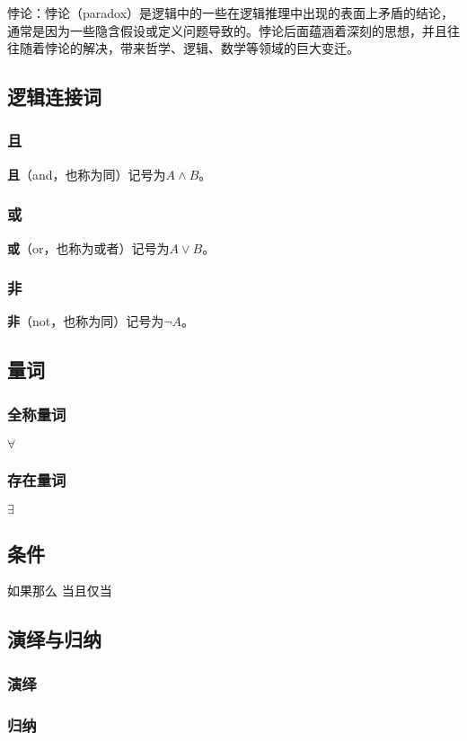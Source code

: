 悖论：悖论（paradox）是逻辑中的一些在逻辑推理中出现的表面上矛盾的结论，通常是因为一些隐含假设或定义问题导致的。悖论后面蕴涵着深刻的思想，并且往往随着悖论的解决，带来哲学、逻辑、数学等领域的巨大变迁。

\subsection{逻辑连接词}

\subsubsection{且}

\textbf{且}（and，也称为同）记号为$A\land B$。

\subsubsection{或}

\textbf{或}（or，也称为或者）记号为$A\lor B$。


\subsubsection{非}
\textbf{非}（not，也称为同）记号为$\lnot A$。

\subsection{量词}

\subsubsection{全称量词}

$\forall$

\subsubsection{存在量词}

$\exists$

\subsection{条件}
如果那么 当且仅当
\subsection{演绎与归纳}

\subsubsection{演绎}

\subsubsection{归纳}